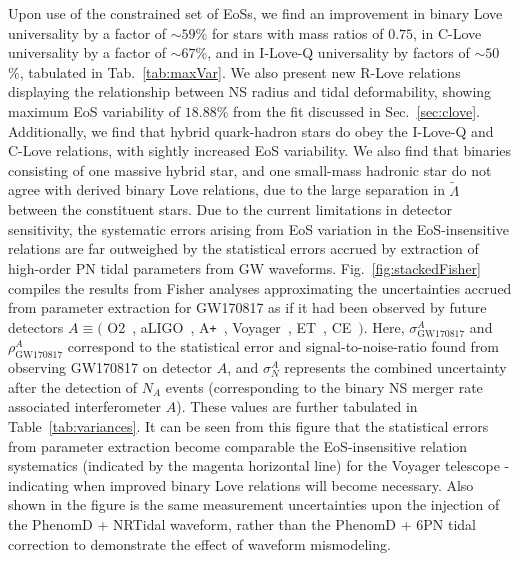 \documentclass[prd,twocolumn,nofootinbib,superscriptaddress,amsmath,amssymb]{revtex4-1}
\begin{document}
Upon use of the constrained set of EoSs, we find an improvement in binary Love universality by a factor of $\sim 59$\% for stars with mass ratios of $0.75$, in C-Love universality by a factor of $\sim 67\%$, and in I-Love-Q universality by factors of $\sim50$\%, tabulated in Tab.~\ref{tab:maxVar}.
We also present new R-Love relations displaying the relationship between NS radius and tidal deformability, showing maximum EoS variability of $18.88\%$ from the fit discussed in Sec.~\ref{sec:clove}.
Additionally, we find that hybrid quark-hadron stars do obey the I-Love-Q and C-Love relations, with sightly increased EoS variability.
We also find that binaries consisting of one massive hybrid star, and one small-mass hadronic star do not agree with derived binary Love relations, due to the large separation in $\tilde{\Lambda}$ between the constituent stars.
Due to the current limitations in detector sensitivity, the systematic errors arising from EoS variation in the EoS-insensitive relations are far outweighed by the statistical errors accrued by extraction of high-order PN tidal parameters from GW waveforms.
Fig.~\ref{fig:stackedFisher} compiles the results from Fisher analyses approximating the uncertainties accrued from parameter extraction for GW170817 as if it had been observed by future detectors $A \equiv ($ O2~\cite{aLIGO}, aLIGO~\cite{aLIGO}, A\texttt{+}~\cite{Ap_Voyager_CE}, Voyager~\cite{Ap_Voyager_CE}, ET~\cite{ET}, CE~\cite{Ap_Voyager_CE}$)$.
Here, $\sigma^A_{\text{GW170817}}$ and $\rho^A_{\text{GW170817}}$ correspond to the statistical error and signal-to-noise-ratio found from observing GW170817 on detector $A$, and $\sigma^A_N$ represents the combined uncertainty after the detection of $N_A$ events (corresponding to the binary NS merger rate associated interferometer $A$).
These values are further tabulated in Table~\ref{tab:variances}.
It can be seen from this figure that the statistical errors from parameter extraction become comparable the EoS-insensitive relation systematics (indicated by the magenta horizontal line) for the Voyager telescope - indicating when improved binary Love relations will become necessary.
Also shown in the figure is the same measurement uncertainties upon the injection of the PhenomD + NRTidal waveform, rather than the PhenomD + 6PN tidal correction to demonstrate the effect of waveform mismodeling.
\end{document}
